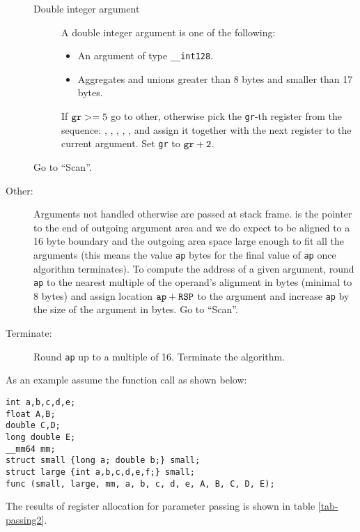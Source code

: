 \begin{description}
\begin{description}
    \item[Double integer argument]
      A double integer argument is one of the following:
      \begin{itemize}
        \item An argument of type \verb|__int128|.
        \item Aggregates and unions greater than 8 bytes and smaller
          than 17 bytes.
      \end{itemize}
      If $\verb|gr| >= 5$ go to other, otherwise pick the \verb|gr|-th register from
      the sequence: \RAX, \RDX, \RCX, \RBX, \RSI, \RDI{} and assign it together with the
      next register to the current argument.
      Set \verb|gr| to $\verb|gr|+2$.
   \end{description}
   Go to ``Scan''.

  \item[Other:]

    Arguments not handled otherwise are passed at stack frame. \RSP{} is the
    pointer to the end of outgoing argument area and we do expect \RSP{} to be
    aligned to a 16 byte boundary and the outgoing area space large enough to fit all
    the arguments (this means the value \verb|ap| bytes for the final value of
    \verb|ap| once algorithm terminates).  To compute the address of a given argument,
    round \verb|ap| to the nearest multiple of the operand's alignment in bytes
    (minimal to 8 bytes) and
    assign location $\verb|ap|+\RSP$ to the argument and increase \verb|ap| by
    the size of the argument in bytes.
    Go to ``Scan''.

  \item[Terminate:]
    Round \verb|ap| up to a multiple of 16. Terminate the algorithm.
\end{description}

As an example assume the function call as shown below:

\begin{verbatim}
int a,b,c,d,e;
float A,B;
double C,D;
long double E;
__mm64 mm;
struct small {long a; double b;} small;
struct large {int a,b,c,d,e,f;} small;
func (small, large, mm, a, b, c, d, e, A, B, C, D, E);
\end{verbatim}

The results of register allocation for parameter passing is shown in table \ref{tab-passing2}.


